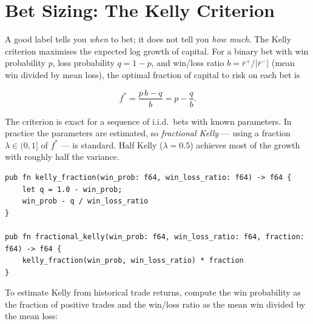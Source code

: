 
\section{Bet Sizing: The Kelly Criterion}

A good label tells you \emph{when} to bet; it does not tell you
\emph{how much}. The Kelly criterion maximises the expected log
growth of capital. For a binary bet with win probability $p$, loss
probability $q = 1 - p$, and win/loss ratio $b = \bar{r}^+ /
|\bar{r}^-|$ (mean win divided by mean loss), the optimal fraction
of capital to risk on each bet is

\begin{equation}
    f^* = \frac{p\, b - q}{b} = p - \frac{q}{b}.
    \label{eq:kelly}
\end{equation}

The criterion is exact for a sequence of i.i.d.\ bets with
known parameters. In practice the parameters are estimated, so
\emph{fractional Kelly} --- using a fraction $\lambda \in (0, 1]$ of
$f^*$ --- is standard. Half Kelly ($\lambda = 0.5$) achieves most of
the growth with roughly half the variance.


\begin{lstlisting}[caption={Kelly criterion and fractional variant}]
pub fn kelly_fraction(win_prob: f64, win_loss_ratio: f64) -> f64 {
    let q = 1.0 - win_prob;
    win_prob - q / win_loss_ratio
}

pub fn fractional_kelly(win_prob: f64, win_loss_ratio: f64, fraction: f64) -> f64 {
    kelly_fraction(win_prob, win_loss_ratio) * fraction
}
\end{lstlisting}

To estimate Kelly from historical trade returns, compute the win
probability as the fraction of positive trades and the win/loss ratio
as the mean win divided by the mean loss:

